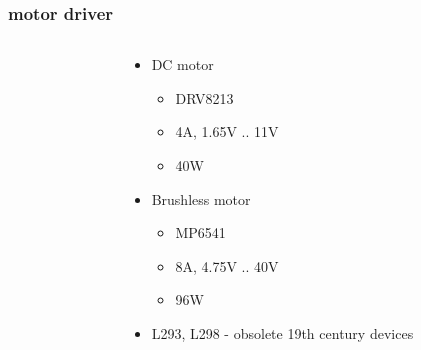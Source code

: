 \documentclass{beamer}
\begin{document}
\begin{frame}
  
  \frametitle{\bf motor driver}


  \begin{columns}

    \begin{column}{0.5\textwidth}
    \end{column}

    \begin{column}{0.5\textwidth}
      \begin{itemize}
        \item DC motor
          \begin{itemize}
            \item DRV8213
            \item 4A, 1.65V .. 11V
            \item 40W
          \end{itemize}
        \item Brushless motor
          \begin{itemize}
            \item MP6541
            \item 8A, 4.75V .. 40V
            \item 96W
          \end{itemize}
        \item L293, L298
          - obsolete 19th century devices
      \end{itemize}
    \end{column}

  \end{columns}

\end{frame}
\end{document}
